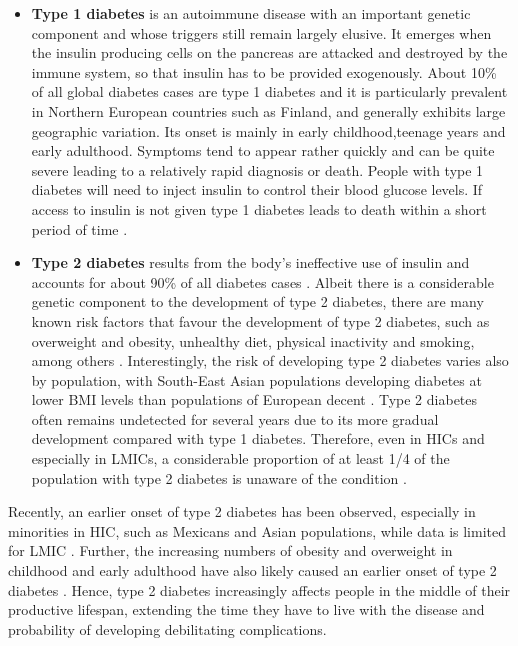 \begin{itemize}
\item \textbf{Type 1 diabetes} is an autoimmune disease with an important genetic component and whose triggers still remain largely elusive. It emerges when the insulin producing cells on the pancreas are attacked and destroyed by the immune system, so that insulin has to be provided exogenously. About 10\% of all global diabetes cases are type 1 diabetes and it is particularly prevalent in Northern European countries such as Finland, and generally exhibits large geographic variation. Its onset is mainly in early childhood,teenage years and early adulthood. Symptoms tend to appear rather quickly and can be quite severe leading to a relatively rapid diagnosis or death. People with type 1 diabetes will need to inject insulin to control their blood glucose levels. If access to insulin is not given type 1 diabetes leads to death within a short period of time \parencite{Tuomilehto2013}. 
\item \textbf{Type 2 diabetes} results from the body's ineffective use of insulin and accounts for about 90\% of all diabetes cases \parencite{WorldHealthOrganization2016}. Albeit there is a considerable genetic component to the development of type 2 diabetes, there are many known risk factors that favour the development of type 2 diabetes, such as overweight and obesity, unhealthy diet, physical inactivity and smoking, among others \parencite{WorldHealthOrganization2016}. Interestingly, the risk of developing type 2 diabetes varies also by population, with South-East Asian populations developing diabetes at lower \ac{BMI} levels than populations of European decent \parencite{Ramachandran2010}. Type 2 diabetes often remains undetected for several years due to its more gradual development compared with type 1 diabetes. Therefore, even in \acp{HIC} and especially in \acp{LMIC}, a considerable proportion of at least 1/4 of the population with type 2 diabetes is unaware of the condition \parencite{Beagley2014}. 
\end{itemize}

Recently, an earlier onset of type 2 diabetes has been observed, especially in minorities in \acs{HIC}, such as Mexicans and Asian populations, while data is limited for \ac{LMIC} \parencite{FazeliFarsani2013}. Further, the increasing numbers of obesity and overweight in childhood and early adulthood have also likely caused an earlier onset of type 2 diabetes \parencite{Chen2012}. Hence, type 2 diabetes increasingly affects people in the middle of their productive lifespan, extending the time they have to live with the disease and probability of developing debilitating complications.

